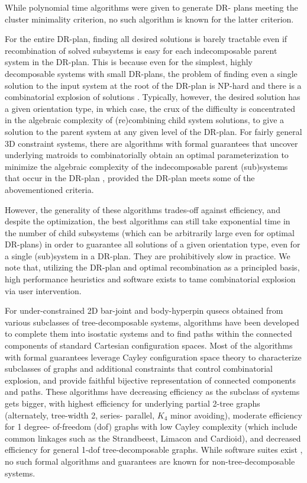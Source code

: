 While polynomial time algorithms were given \uncited to generate DR-
plans meeting the cluster minimality criterion, no such algorithm is
known for the latter criterion.


\medskip\noindent
{}
For the entire DR-plan, finding all desired solutions is barely
tractable even if recombination of solved subsystems is easy for each
indecomposable parent system in the DR-plan. This is because even for
the simplest, highly decomposable systems with small DR-plans, the
problem of finding even a single solution to the input system at the
root of the DR-plan is NP-hard \uncited and there is a combinatorial
explosion of solutions \uncited. Typically, however, the desired
solution has a given orientation type, in which case, the crux of the
difficulty is concentrated in the algebraic complexity of
(re)combining child system solutions, to give a solution to the parent
system at any given level of the DR-plan. For fairly general 3D
constraint systems, there are algorithms with formal guarantees that
uncover underlying matroids to combinatorially obtain an optimal
parameterization to minimize the algebraic complexity of the
indecomposable parent (sub)systems that occur in the DR-plan \uncited\uncited\uncited, provided the DR-plan meets some of the abovementioned
criteria.

However, the generality of these algorithms trades-off against
efficiency, and despite the optimization, the best algorithms can
still take exponential time in the number of child subsystems (which
can be arbitrarily large even for optimal DR-plans) in order to
guarantee all solutions of a given orientation type, even for a single
(sub)system in a DR-plan. They are prohibitively slow in practice. We
note that, utilizing the DR-plan and optimal recombination as a
principled basis, high performance heuristics and software exists
\uncited\uncited to tame combinatorial explosion via user intervention.


\medskip\noindent
{}
For under-constrained 2D bar-joint and body-hyperpin qusecs obtained
from various subclasses of tree-decomposable systems, algorithms have
been developed \uncited\uncited to complete them into isostatic systems
\uncited\uncited and to find paths within the connected components
\uncited\uncited of standard Cartesian configuration spaces. Most of the
algorithms with formal guarantees leverage Cayley configuration space
theory \uncited\uncited to characterize subclasses of graphs and
additional constraints that control combinatorial explosion, and
provide faithful bijective representation of connected components and
paths. These algorithms have decreasing efficiency as the subclass of
systems gets bigger, with highest efficiency for underlying partial
2-tree graphs (alternately, tree-width 2, series- parallel, $K_4$
minor avoiding), moderate efficiency for 1 degree- of-freedom (dof)
graphs with low Cayley complexity (which include common linkages such
as the Strandbeest, Limacon and Cardioid), and decreased efficiency
for general 1-dof tree-decomposable graphs. While software suites
exist \uncited\uncited, no such formal algorithms and guarantees are known
for non-tree-decomposable systems.

